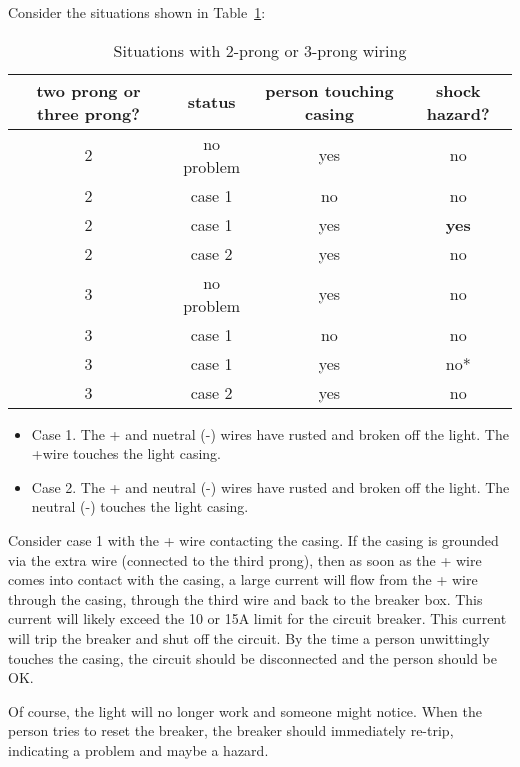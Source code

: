 Consider the situations shown in Table~\ref{T:2P3}:\par
\begin{table}[H]
\begin{center}
\begin{tabular}{c|c|c|c}
two prong or three prong?&status&person touching casing&shock hazard?\\ \hline
2	&	no problem	& yes	& no\\ \hline
2	&	case 1		& no	& no\\ \hline
2	&	case 1		& yes	& \textbf{yes}\\ \hline
2	&	case 2		& yes	& no\\ \hline
3	&	no problem	& yes	& no\\ \hline
3	&	case 1		& no	& no\\ \hline
3	&	case 1		& yes	& no*\\ \hline
3	&	case 2		& yes	& no\\ \hline
\end{tabular}\par
\caption{Situations with 2-prong or 3-prong wiring}
\label{T:2P3}
\end{center}
\end{table}

\begin{itemize}
\item Case 1. The + and nuetral (-) wires have rusted and broken off the light. The +wire touches the light casing.
\item Case 2. The + and neutral (-) wires have rusted and broken off the light. The neutral (-) touches the light casing.
\end{itemize}

Consider case 1 with the + wire contacting the casing. If the casing is grounded via the extra wire (connected to the third prong), then as soon as the + wire comes into contact with the casing, a large current will flow from the + wire through the casing, through the third wire and back to the breaker box. This current will likely exceed the 10 or 15A limit for the circuit breaker. This current will trip the breaker and shut off the circuit. By the time a person unwittingly touches the casing, the circuit should be disconnected and the person should be OK.\par

Of course, the light will no longer work and someone might notice. When the person tries to reset the breaker, the breaker should immediately re-trip, indicating a problem and maybe a hazard.\par

